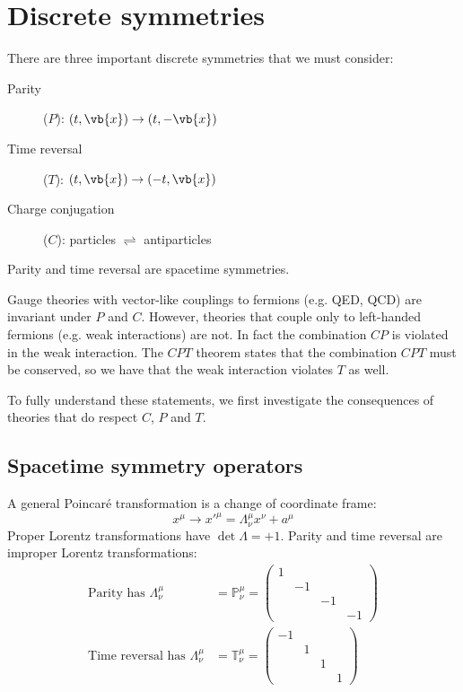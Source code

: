 \documentclass{jknotes}
\begin{document}
\section{Discrete symmetries}
There are three important discrete symmetries that we must consider:
\begin{description}
    \item[Parity] (\(P\)): \((t,\vb{x})\rightarrow(t,-\vb{x})\)
    \item[Time reversal] (\(T\)): \((t,\vb{x})\rightarrow(-t,\vb{x})\)
    \item[Charge conjugation] (\(C\)): particles \(\rightleftharpoons\) antiparticles
\end{description}
Parity and time reversal are spacetime symmetries.

Gauge theories with vector-like couplings to fermions (e.g. QED, QCD) are invariant under \(P\) and \(C\). However, theories that couple only to left-handed fermions (e.g. weak interactions) are not. In fact the combination \(CP\) is violated in the weak interaction. The \(CPT\) theorem states that the combination \(CPT\) must be conserved, so we have that the weak interaction violates \(T\) as well. 

To fully understand these statements, we first investigate the consequences of theories that do respect \(C\), \(P\) and \(T\).

\subsection{Spacetime symmetry operators}
A general Poincar\'e transformation is a change of coordinate frame:
\begin{equation}
    x^\mu \rightarrow x'^\mu = \Lambda^\mu_\nu x^\nu + a^\mu
\end{equation}
Proper Lorentz transformations have \(\det\Lambda = +1\). Parity and time reversal are improper Lorentz transformations:
\begin{align}
    \text{Parity has } \Lambda_\nu^\mu &= \mathbb{P}^\mu_\nu = 
    \begin{pmatrix}
        1 \\
        &-1\\
        &&-1\\
        &&&-1
    \end{pmatrix} \\
    \text{Time reversal has } \Lambda_\nu^\mu &= \mathbb{T}^\mu_\nu = 
    \begin{pmatrix}
        -1 \\
        &1 \\
        &&1\\
        &&&1
    \end{pmatrix}
\end{align}
\end{document}
